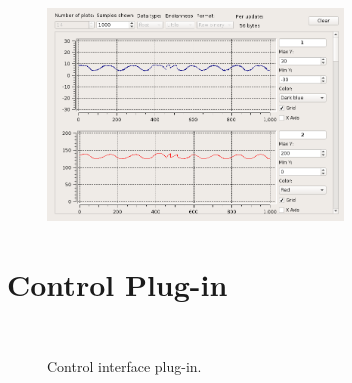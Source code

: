 \begin{figure}
\centering
\includegraphics[width=0.7\textwidth]{images/gui/plotting}
\end{figure}

\section{Control Plug-in}

\begin{figure}
\centering
{}
~
\caption{Control interface plug-in.}
\label{fig:Control interface plug-in} 
\end{figure}

